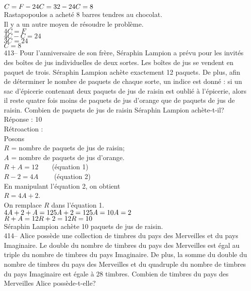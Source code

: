 ﻿\documentclass[letterpaper, 12pt]{article}
\begin{document}
$C=F-24\\
C=32-24\\
C=8$\\
Rastapopoulos a achet\'e 8 barres tendres au chocolat.\\

Il y a un autre moyen de r\'esoudre le probl\`eme.\\
$4C=F$\\
$4C-C=24$\\
$3C=24$\\
$C=8$\\


413-- Pour l'anniversaire de son fr\`ere, S\'eraphin Lampion a pr\'evu pour
les invit\'es des bo\^ites de jus individuelles de deux sortes.  Les
bo\^ites de jus se vendent en paquet de trois.  S\'eraphin Lampion ach\`ete
exactement 12 paquets.  De plus, afin de d\'eterminer le nombre de paquets
de chaque sorte, un indice est donn\'e : si un sac d'\'epicerie contenant
deux paquets de jus de raisin est oubli\'e \`a l'\'epicerie, alors il reste
quatre fois moins de paquets de jus d'orange que de paquets de jus de
raisin.  Combien de paquets de jus de raisin S\'eraphin Lampion
ach\`ete-t-il?\\

R\'eponse : 10\\

R\'etroaction : \\
Posons\\
$R$ = nombre de paquets de jus de raisin;\\
$A$ = nombre de paquets de jus d'orange.\\
$R+A=12  \qquad$(\'equation 1)\\
$R-2=4A \qquad$ (\'equation 2)\\
En manipulant l'\'equation 2, on obtient\\
$R=4A+2$.\\
On remplace $R$ dans l'\'equation 1.\\
$4A+2+A=12\\
5A+2=12\\
5A=10\\
A=2$\\

$R+A=12\\
R+2=12\\
R=10$\\
S\'eraphin Lampion ach\`ete 10 paquets de jus de raisin.\\

414-- Alice poss\`ede une collection de timbres du pays des Merveilles et du
pays Imaginaire.  Le double du nombre de timbres du pays des Merveilles est
\'egal au triple du nombre de timbres du pays Imaginaire.  De plus, la somme
du double du nombre de timbres du pays des Merveilles et du quadruple du
nombre de timbres du pays Imaginaire est \'egale \`a 28 timbres.  Combien de
timbres du pays des Merveilles Alice poss\`ede-t-elle?\\
\end{document}
